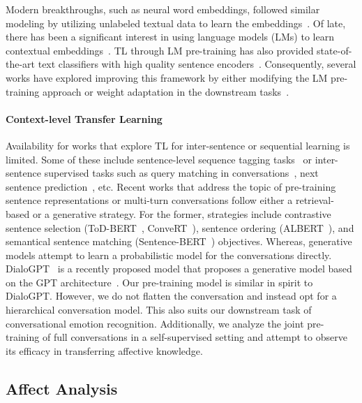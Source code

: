 \documentclass[preprint,3pt]{elsarticle}
\begin{document}
Modern breakthroughs, such as neural word embeddings, followed similar modeling by utilizing unlabeled textual data to learn the embeddings~\cite{mikolov2013distributed}. Of late, there has been a significant interest in using language models (LMs) to learn contextual embeddings~\cite{mccann2017learned,peters2018deep}. TL through LM pre-training has also provided state-of-the-art text classifiers with high quality sentence encoders~\cite{dai2015semi, devlin2018bert,DBLP:journals/corr/abs-1906-08237}. Consequently, several works have explored improving this framework by either modifying the LM pre-training approach or weight adaptation in the downstream tasks~\cite{howard2018universal,DBLP:journals/corr/abs-1907-11692}.

\paragraph{Context-level Transfer Learning}

Availability for works that explore TL for inter-sentence or sequential learning is limited. Some of these include sentence-level sequence tagging tasks~\cite{chen2019transfer} or inter-sentence supervised tasks such as query matching in conversations~\cite{qiu2018transfer}, next sentence prediction~\cite{devlin2018bert}, etc. Recent works that address the topic of pre-training sentence representations or multi-turn conversations follow either a retrieval-based or a generative strategy. For the former, strategies include contrastive sentence selection (ToD-BERT~\cite{DBLP:journals/corr/abs-2004-06871}, ConveRT~\cite{DBLP:journals/corr/abs-1911-03688}), sentence ordering (ALBERT~\cite{DBLP:conf/iclr/LanCGGSS20}), and semantical sentence matching (Sentence-BERT~\cite{DBLP:conf/emnlp/ReimersG19}) objectives. Whereas, generative models attempt to learn a probabilistic model for the conversations directly. DialoGPT~\cite{DBLP:journals/corr/abs-1911-00536} is a recently proposed model that proposes a generative model based on the GPT architecture~\cite{radfordlanguage}. Our pre-training model is similar in spirit to DialoGPT. However, we do not flatten the conversation and instead opt for a hierarchical conversation model. This also suits our downstream task of conversational emotion recognition. Additionally, we analyze the joint pre-training of full conversations in a self-supervised setting and attempt to observe its efficacy in transferring affective knowledge.

\subsection{Affect Analysis}
\end{document}
